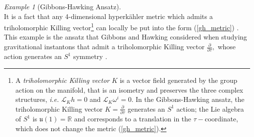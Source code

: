 \documentclass[a4paper,12pt, onecolumn, notitlepage]{article}
\theoremstyle{definition}
\theoremstyle{remark}
\newtheorem{ex}[thm]{Example}
\newcommand{\ie}{\emph{i.e.} }
\newcommand{\w}{\omega}
\newcommand{\ddt}[1]{\frac{\partial #1}{\partial \tau}}
\newcommand{\HK}{hyperk\"ahler }
\begin{document}
\begin{ex}[Gibbons-Hawking Ansatz]
\begin{equation}
	\end{equation}
	It is a fact that any 4-dimensional \HK metric which admits a triholomorphic Killing vector\footnote{A \emph{triholomorphic Killing vector} $K$ is a vector field generated by the group action on the manifold, that is an isometry and preserves the three complex structures, \ie $\mathcal{L}_{K}h=0$ and $\mathcal{L}_{K}\w^{i}=0.$ In the Gibbons-Hawking ansatz, the triholomorphic Killing vector $K=\ddt{}$ generates an $S^{1}$ action; the Lie algebra of $S^{1}$ is $\mathfrak{u}(1)=\mathbb{R}$ and corresponds to a translation in the $\tau-$coordinate, which does not change the metric (\ref{gh_metric}).} can locally be put into the form (\ref{gh_metric}) \cite{solitons}. This example is the ansatz that Gibbons and Hawking considered when studying gravitational instantons that admit a triholomorphic Killing vector $\ddt{},$ whose action generates an $S^{1}$ symmetry \cite{gibbons_1978}.\\
\end{ex}
\end{document}
